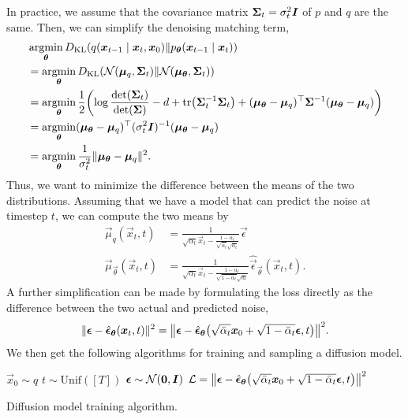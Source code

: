 In practice, we assume that the covariance matrix $\bm{\Sigma}_t = \sigma_t^2 \bm{I}$ of $p$ and $q$ are the same. Then, we can simplify the denoising matching term,
\begin{align*}
    &\argmin_{\vec{\theta}} D_{\mathrm{KL}}(q(\vec{x}_{t-1} \mid \vec{x}_t, \vec{x}_0) \lVert p_{\vec{\theta}}(\vec{x}_{t-1} \mid \vec{x}_t)) \\
    & = \argmin_{\vec{\theta}} D_{\mathrm{KL}}\lft( \mathcal{N}(\vec{\mu}_q, \mat{\Sigma}_t) \lVert \mathcal{N}(\vec{\mu}_{\vec{\theta}}, \mat{\Sigma}_t) \rgt) \\
    & = \argmin_{\vec{\theta}} \frac{1}{2} \lft( \log \frac{\det{\mat{\Sigma}_t}}{\det{\mat{\Sigma}}} - d + \tr{\inv{\mat{\Sigma}_t} \mat{\Sigma}_t} + \transpose{(\vec{\mu}_{\vec{\theta}} - \vec{\mu}_q)} \inv{\mat{\Sigma}} (\vec{\mu}_{\vec{\theta}} - \vec{\mu}_q) \rgt) \\
    & = \argmin_{\vec{\theta}} \transpose{(\vec{\mu}_{\vec{\theta}} - \vec{\mu}_q)} \inv{(\sigma^2_t \mat{I})} (\vec{\mu}_{\vec{\theta}} - \vec{\mu}_q) \\
    & = \argmin_{\vec{\theta}} \frac{1}{\sigma_t^2} \| \vec{\mu}_{\vec{\theta}} - \vec{\mu}_q \|^2.
\end{align*}
Thus, we want to minimize the difference between the means of the two distributions. Assuming that we have a model that can predict the noise at timestep $t$, we can compute the two means by
\begin{align*}
    \vec{\mu}_q(\vec{x}_t, t) &= \frac{1}{\sqrt{\alpha_t} \vec{x}_t - \frac{1 - \alpha_t}{\sqrt{\bar{\alpha}_t} \sqrt{\alpha_t}}} \vec{\epsilon} \\
    \vec{\mu}_{\vec{\theta}}(\vec{x}_t, t) &= \frac{1}{\sqrt{\alpha_t} \vec{x}_t - \frac{1 - \alpha_t}{\sqrt{1 - \bar{\alpha}_t} \sqrt{\alpha_t}}} \hat{\vec{\epsilon}}_{\vec{\theta}}(\vec{x}_t, t).
\end{align*}
A further simplification can be made by formulating the loss directly as the difference between the two actual and predicted noise, \[
    \| \vec{\epsilon} - \hat{\vec{\epsilon}}_{\vec{\theta}}(\vec{x}_t, t) \|^2 = \lft\| \vec{\epsilon} - \hat{\vec{\epsilon}}_{\vec{\theta}}\lft(\sqrt{\bar{\alpha}_t} \vec{x}_0 + \sqrt{1 - \bar{\alpha}_t}\vec{\epsilon}, t\rgt) \rgt\|^2.
\]
We then get the following algorithms for training and sampling a diffusion model.

\begin{algorithm}
    \begin{algorithmic}[1]
        \State $\vec{x}_0 \sim q$
        \State $t \sim \mathrm{Unif}([T])$
        \State $\bm{\epsilon} \sim \mathcal{N}(\bm{0}, \bm{I})$
        \State $\mathcal{L} = \lft\| \vec{\epsilon} - \hat{\vec{\epsilon}}_{\vec{\theta}}\lft( \sqrt{\bar{\alpha}_t} \vec{x}_0 + \sqrt{1 - \bar{\alpha}_t} \vec{\epsilon}, t \rgt) \rgt\|^2$
        \EndWhile
    \end{algorithmic}
    \caption{Diffusion model training algorithm.}
\end{algorithm}

